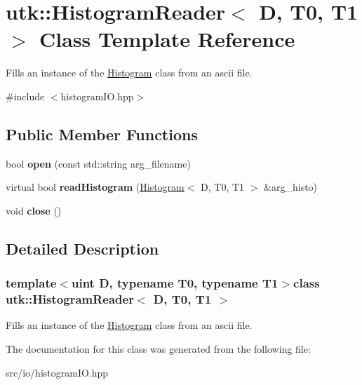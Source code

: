 \hypertarget{classutk_1_1HistogramReader}{\section{utk\-:\-:Histogram\-Reader$<$ D, T0, T1 $>$ Class Template Reference}
\label{classutk_1_1HistogramReader}
}


Fills an instance of the \hyperlink{classutk_1_1Histogram}{Histogram} class from an ascii file.  




{\ttfamily \#include $<$histogram\-I\-O.\-hpp$>$}

\subsection*{Public Member Functions}
\begin{DoxyCompactItemize}
\item 
\hypertarget{classutk_1_1HistogramReader_a1a2684f4786dc20a7ba8d698e5898f4c}{bool {\bfseries open} (const std\-::string arg\-\_\-filename)}\label{classutk_1_1HistogramReader_a1a2684f4786dc20a7ba8d698e5898f4c}

\item 
\hypertarget{classutk_1_1HistogramReader_afd1ec63b0aba6a325af298b573b83659}{virtual bool {\bfseries read\-Histogram} (\hyperlink{classutk_1_1Histogram}{Histogram}$<$ D, T0, T1 $>$ \&arg\-\_\-histo)}\label{classutk_1_1HistogramReader_afd1ec63b0aba6a325af298b573b83659}

\item 
\hypertarget{classutk_1_1HistogramReader_a56421b96b8878fe25e44cc18a0443a1f}{void {\bfseries close} ()}\label{classutk_1_1HistogramReader_a56421b96b8878fe25e44cc18a0443a1f}

\end{DoxyCompactItemize}


\subsection{Detailed Description}
\subsubsection*{template$<$uint D, typename T0, typename T1$>$class utk\-::\-Histogram\-Reader$<$ D, T0, T1 $>$}

Fills an instance of the \hyperlink{classutk_1_1Histogram}{Histogram} class from an ascii file. 

The documentation for this class was generated from the following file\-:\begin{DoxyCompactItemize}
\item 
src/io/histogram\-I\-O.\-hpp\end{DoxyCompactItemize}
